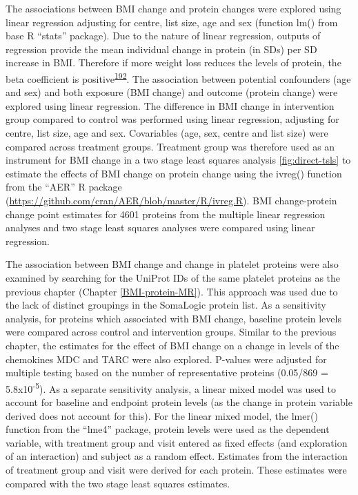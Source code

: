 \documentclass[11pt,twoside]{bristolthesis}
\begin{document}
The associations between BMI change and protein changes were explored using linear regression adjusting for centre, list size, age and sex (function lm() from base R ``stats'' package). Due to the nature of linear regression, outputs of regression provide the mean individual change in protein (in SDs) per SD increase in BMI. Therefore if more weight loss reduces the levels of protein, the beta coefficient is positive\textsuperscript{\protect\hyperlink{ref-Figarska2020}{192}}. The association between potential confounders (age and sex) and both exposure (BMI change) and outcome (protein change) were explored using linear regression. The difference in BMI change in intervention group compared to control was performed using linear regression, adjusting for centre, list size, age and sex. Covariables (age, sex, centre and list size) were compared across treatment groups. Treatment group was therefore used as an instrument for BMI change in a two stage least squares analysis \ref{fig:direct-tsls} to estimate the effects of BMI change on protein change using the ivreg() function from the ``AER'' R package (\url{https://github.com/cran/AER/blob/master/R/ivreg.R}). BMI change-protein change point estimates for 4601 proteins from the multiple linear regression analyses and two stage least squares analyses were compared using linear regression.

The association between BMI change and change in platelet proteins were also examined by searching for the UniProt IDs of the same platelet proteins as the previous chapter (Chapter \ref{BMI-protein-MR}). This approach was used due to the lack of distinct groupings in the SomaLogic protein list. As a sensitivity analysis, for proteins which associated with BMI change, baseline protein levels were compared across control and intervention groups. Similar to the previous chapter, the estimates for the effect of BMI change on a change in levels of the chemokines MDC and TARC were also explored. P-values were adjusted for multiple testing based on the number of representative proteins (0.05/869 = 5.8x10\textsuperscript{-5}). As a separate sensitivity analysis, a linear mixed model was used to account for baseline and endpoint protein levels (as the change in protein variable derived does not account for this). For the linear mixed model, the lmer() function from the ``lme4'' package, protein levels were used as the dependent variable, with treatment group and visit entered as fixed effects (and exploration of an interaction) and subject as a random effect. Estimates from the interaction of treatment group and visit were derived for each protein. These estimates were compared with the two stage least squares estimates.
\end{document}
